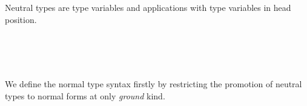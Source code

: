 \documentclass[authoryear, acmsmall, screen, review, nonacm]{acmart}
\begin{document}
Neutral types are type variables and applications with type variables in head position.

\begin{code}%
\>[0]\AgdaSpace{}%
\AgdaSpace{}%
\AgdaSpace{}%
\AgdaSymbol{:}\AgdaSpace{}%
\AgdaSpace{}%
\AgdaSpace{}%
\AgdaSpace{}%
\<%
\\
\>[0][@{}l@{\AgdaIndent{0}}]%
\>[2]\AgdaSpace{}%
\AgdaSymbol{:}\AgdaSpace{}%
\AgdaSymbol{(}\AgdaSpace{}%
\AgdaSymbol{:}\AgdaSpace{}%
\AgdaSpace{}%
\AgdaSpace{}%
\AgdaSymbol{)}\AgdaSpace{}%
%
\>[24]\AgdaSpace{}%
\AgdaSpace{}%
\<%
\\
%
\>[2]\AgdaSpace{}%
\AgdaSymbol{:}%
\>[2774I]\AgdaSymbol{(}\AgdaSpace{}%
\AgdaSymbol{:}\AgdaSpace{}%
\AgdaSpace{}%
\AgdaSpace{}%
\AgdaSymbol{(}\AgdaSpace{}%
\AgdaSpace{}%
\AgdaSymbol{))}\AgdaSpace{}%
\AgdaSpace{}%
\AgdaSymbol{(}\AgdaSpace{}%
\AgdaSymbol{:}\AgdaSpace{}%
\AgdaSpace{}%
\AgdaSpace{}%
\AgdaSymbol{)}\AgdaSpace{}%
\<%
\\
\>[.][@{}l@{}]\<[2774I]%
\>[8]\AgdaSpace{}%
\AgdaSpace{}%
\<%
\end{code}

We define the normal type syntax firstly by restricting the promotion of neutral types to normal forms at only \emph{ground} kind.

\begin{code}%
\>[0]\AgdaSpace{}%
\AgdaSpace{}%
\AgdaSpace{}%
\<%
\\
\>[0][@{}l@{\AgdaIndent{0}}]%
\>[2]\AgdaSpace{}%
\AgdaSymbol{:}\AgdaSpace{}%
\AgdaSymbol{(}\AgdaSpace{}%
\AgdaSymbol{:}\AgdaSpace{}%
\AgdaSpace{}%
\AgdaSpace{}%
\AgdaSymbol{)}\AgdaSpace{}%
\AgdaSpace{}%
\AgdaSymbol{\{}\AgdaSpace{}%
\AgdaSymbol{:}\AgdaSpace{}%
\AgdaSpace{}%
\AgdaSymbol{(}\AgdaSpace{}%
\AgdaSymbol{)\}}\AgdaSpace{}%
\AgdaSpace{}%
\AgdaSpace{}%
\AgdaSpace{}%
\<%
\end{code}
\end{document}
